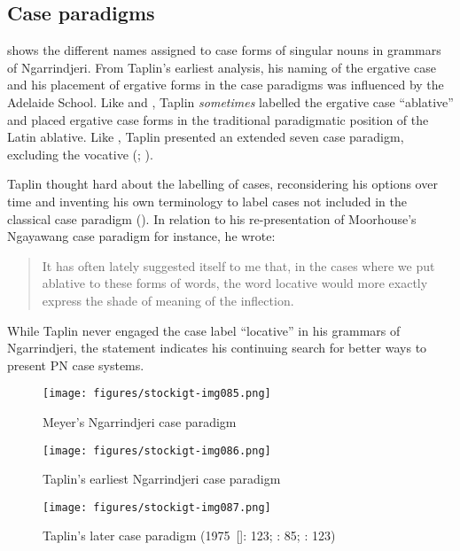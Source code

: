 \subsection{Case paradigms}
\label{sec:key:7.3.4}\label{bkm:Ref456259132}


 shows the different names assigned to case forms of singular nouns in grammars of Ngarrindjeri. From Taplin’s earliest analysis, his naming of the ergative case and his placement of ergative forms in the case paradigms was influenced by the Adelaide School. Like \citet{teichelmann_outlines_1840} and \citet{meyer_vocabulary_1843}, Taplin \textit{sometimes} labelled the ergative case “ablative” and placed ergative case forms in the traditional paradigmatic position of the Latin ablative. Like \citet{meyer_vocabulary_1843}, Taplin presented an extended seven case paradigm, excluding the vocative (; ).

Taplin thought hard about the labelling of cases, reconsidering his options over time and inventing his own terminology to label cases not included in the classical case paradigm (). In relation to his re-presentation of Moorhouse’s Ngayawang case paradigm for instance, he wrote:

\begin{quote}
It has often lately suggested itself to me that, in the cases where we put ablative to these forms of words, the word locative would more exactly express the shade of meaning of the inflection. \citep[32]{taplin_1879a_nodate}
\end{quote}

While Taplin never engaged the case label “locative” in his grammars of Ngarrindjeri, the statement indicates his continuing search for better ways to present PN case systems.

\begin{figure}
\texttt{[image: figures/stockigt-img085.png]}
\caption{Meyer's Ngarrindjeri case paradigm \citeyearpar[24]{meyer_vocabulary_1843}}
\label{fig:key:7-139}
\end{figure}

\begin{figure}
\texttt{[image: figures/stockigt-img086.png]}
\caption{Taplin's earliest Ngarrindjeri case paradigm \citeyearpar{taplin_vocabulary_1867}}
\label{bkm:Ref456016644}\label{fig:key:7-140}
\end{figure}

\begin{figure}
\texttt{[image: figures/stockigt-img087.png]}
\caption{Taplin's later case paradigm (1975~[\citeyear{taplin_notes_1870}]: 123; \citeyear{taplin_notes_1872}: 85; \citeyear{taplin_narrinyeri_1879}: 123)}
\label{bkm:Ref456016650}\label{fig:key:7-141}
\end{figure}


